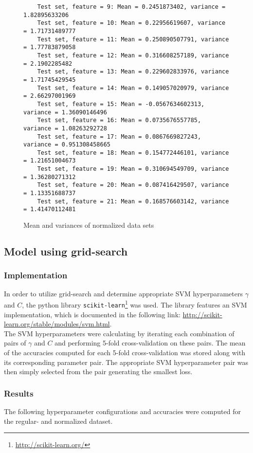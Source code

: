 \documentclass[a4paper]{article}
\begin{document}
\begin{figure}[H]
\begin{lstlisting}
	Test set, feature = 9: Mean = 0.2451873402, variance = 1.82895633206
	Test set, feature = 10: Mean = 0.22956619607, variance = 1.71731489777
	Test set, feature = 11: Mean = 0.250890507791, variance = 1.77783879058
	Test set, feature = 12: Mean = 0.316608257189, variance = 2.1902285482
	Test set, feature = 13: Mean = 0.229602833976, variance = 1.71745429545
	Test set, feature = 14: Mean = 0.149057020979, variance = 2.66297001969
	Test set, feature = 15: Mean = -0.0567634602313, variance = 1.36090146496
	Test set, feature = 16: Mean = 0.0735676557785, variance = 1.08263292728
	Test set, feature = 17: Mean = 0.0867669827243, variance = 0.951308458665
	Test set, feature = 18: Mean = 0.154772446101, variance = 1.21651004673
	Test set, feature = 19: Mean = 0.310694549709, variance = 1.36280271312
	Test set, feature = 20: Mean = 0.087416429507, variance = 1.13351688737
	Test set, feature = 21: Mean = 0.168576603142, variance = 1.41470112481
	\end{lstlisting}
	\caption{Mean and variances of normalized data sets}
	\label{fig:mean_variance_data}
\end{figure}


\subsection{Model using grid-search}
\subsubsection{Implementation}
In order to utilize grid-search and determine appropriate SVM hyperparameters $\gamma$ and $C$, the python library \texttt{scikit-learn}\footnote{\url{http://scikit-learn.org/}} was used. The library features an SVM implementation, which is documented in the following link: \url{http://scikit-learn.org/stable/modules/svm.html}.\\

The SVM hyperparameters were calculating by iterating each combination of pairs of $\gamma$ and $C$ and performing 5-fold cross-validation on these pairs. The mean of the accuracies computed for each 5-fold cross-validation was stored along with its corresponding parameter pair. The appropriate SVM hyperparameter pair was then simply selected from the pair generating the smallest loss.

\subsubsection{Results}
The following hyperparameter configurations and accuracies were computed for the regular- and normalized dataset.
\end{document}
